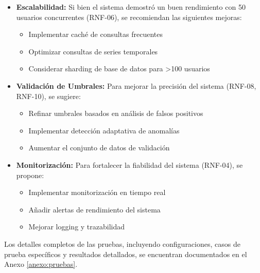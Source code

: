 \begin{itemize}
    \item \textbf{Escalabilidad:} Si bien el sistema demostró un buen rendimiento con 50 usuarios concurrentes (RNF-06), se recomiendan las siguientes mejoras:
        \begin{itemize}
            \item Implementar caché de consultas frecuentes
            \item Optimizar consultas de series temporales
            \item Considerar sharding de base de datos para >100 usuarios
        \end{itemize}
    \item \textbf{Validación de Umbrales:} Para mejorar la precisión del sistema (RNF-08, RNF-10), se sugiere:
        \begin{itemize}
            \item Refinar umbrales basados en análisis de falsos positivos
            \item Implementar detección adaptativa de anomalías
            \item Aumentar el conjunto de datos de validación
        \end{itemize}
    \item \textbf{Monitorización:} Para fortalecer la fiabilidad del sistema (RNF-04), se propone:
        \begin{itemize}
            \item Implementar monitorización en tiempo real
            \item Añadir alertas de rendimiento del sistema
            \item Mejorar logging y trazabilidad
        \end{itemize}
\end{itemize}

Los detalles completos de las pruebas, incluyendo configuraciones, casos de prueba específicos y resultados detallados, se encuentran documentados en el Anexo \ref{anexo:pruebas}.


